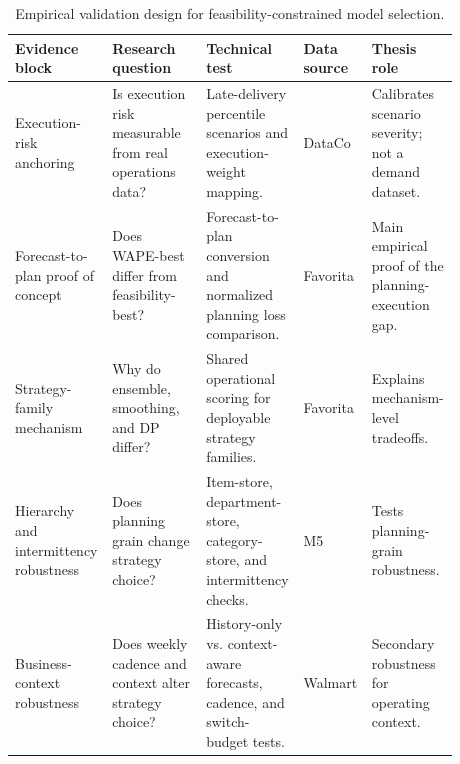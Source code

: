 \begin{table}[H]
\centering
\caption{Empirical validation design for feasibility-constrained model selection.}
\label{tab:dataset-roles}
\scriptsize
\renewcommand{\arraystretch}{0.85}
\setlength{\tabcolsep}{2pt}
\begin{tabular}{@{}p{0.17\linewidth}p{0.21\linewidth}p{0.20\linewidth}p{0.12\linewidth}p{0.18\linewidth}@{}}
\toprule
\textbf{Evidence block} & \textbf{Research question} & \textbf{Technical test} & \textbf{Data source} & \textbf{Thesis role} \\
\midrule
Execution-risk anchoring & Is execution risk measurable from real operations data? & Late-delivery percentile scenarios and execution-weight mapping. & DataCo & Calibrates scenario severity; not a demand dataset. \\
Forecast-to-plan proof of concept & Does WAPE-best differ from feasibility-best? & Forecast-to-plan conversion and normalized planning loss comparison. & Favorita & Main empirical proof of the planning-execution gap. \\
Strategy-family mechanism & Why do ensemble, smoothing, and DP differ? & Shared operational scoring for deployable strategy families. & Favorita & Explains mechanism-level tradeoffs. \\
Hierarchy and intermittency robustness & Does planning grain change strategy choice? & Item-store, department-store, category-store, and intermittency checks. & M5 & Tests planning-grain robustness. \\
Business-context robustness & Does weekly cadence and context alter strategy choice? & History-only vs. context-aware forecasts, cadence, and switch-budget tests. & Walmart & Secondary robustness for operating context. \\
\bottomrule
\end{tabular}
\end{table}
